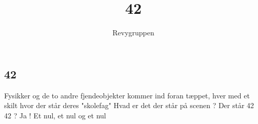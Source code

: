 \documentclass[danish]{article}
\title{42}
\author{Revygruppen}
\begin{document}
\maketitle

\begin{sketch}

\subsection*{42}
\begin{roles}
\end{roles}

\scene Fysikker og de to andre fjendeobjekter kommer ind foran tæppet, hver med
et skilt hvor der står deres "skolefag"
 Hvad er det der står på scenen ?
 Der står 42
 42 ?
 Ja ! Et nul, et nul og et nul

\end{sketch}
\end{document}
